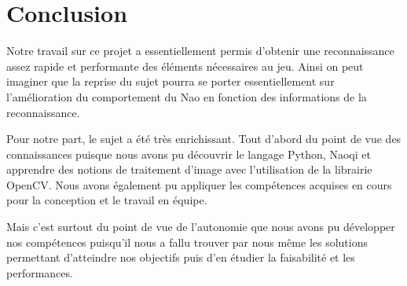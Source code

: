 \section{Conclusion}
\label{sec:Conclusion}
\par Notre travail sur ce projet a essentiellement permis d'obtenir une reconnaissance assez rapide et performante des éléments nécessaires au jeu. Ainsi on peut imaginer que la reprise du sujet pourra se porter essentiellement sur l'amélioration du comportement du Nao en fonction des informations de la reconnaissance.
\par Pour notre part, le sujet a été très enrichissant. Tout d'abord du point de vue des connaissances puisque nous avons pu découvrir le langage Python, Naoqi et apprendre des notions de traitement d'image avec l'utilisation de la librairie OpenCV. Nous avons également pu appliquer les compétences acquises en cours pour la conception et le travail en équipe. 
\par Mais c'est surtout du point de vue de l'autonomie que nous avons pu   développer nos compétences puisqu'il nous a fallu trouver par nous même les solutions permettant d'atteindre nos objectifs puis d'en étudier la faisabilité et les performances.


\pagebreak
